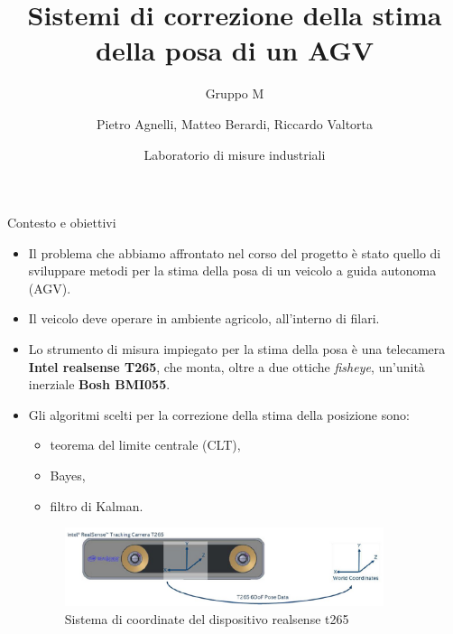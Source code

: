 \documentclass{beamer}
\title{Sistemi di correzione della stima della posa di un AGV}
\subtitle{Gruppo M}
\author{Pietro Agnelli, Matteo Berardi, Riccardo Valtorta}
\date{Laboratorio di misure industriali}
\begin{document}
\maketitle

\begin{frame}{Contesto e obiettivi}
\begin{itemize}
\item Il problema che abbiamo affrontato nel corso del progetto è stato quello di sviluppare metodi per la stima della posa di un veicolo a guida autonoma (AGV).
\item Il veicolo deve operare in ambiente agricolo, all'interno di filari.
\item Lo strumento di misura impiegato per la stima della posa è una telecamera \textbf{Intel realsense T265}, che monta, oltre a due ottiche \emph{fisheye}, un'unità inerziale \textbf{Bosh BMI055}.
\item Gli algoritmi scelti per la correzione della stima della posizione sono:
\begin{itemize}
    \item teorema del limite centrale (CLT),
    \item Bayes,
    \item filtro di Kalman.
\end{itemize}
\begin{figure}
    \centering
    \includegraphics[height=2.3cm]{images/t265.jpg}
    \caption{Sistema di coordinate del dispositivo realsense t265}
    \label{fig:t265coord}
\end{figure}
\end{itemize}
\end{frame}
\end{document}
